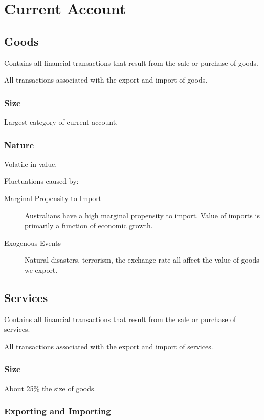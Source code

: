 \documentclass[a4paper,11pt]{article}
\begin{document}
\section{Current Account}

\subsection{Goods}

Contains all financial transactions that result from the sale or purchase of
goods.

All transactions associated with the export and import of goods.


\subsubsection{Size}

Largest category of current account.


\subsubsection{Nature}

Volatile in value.

Fluctuations caused by:

\begin{description}
\item [Marginal Propensity to Import] Australians have a high marginal
	propensity to import. Value of imports is primarily a function of economic
	growth.
\item [Exogenous Events] Natural disasters, terrorism, the exchange rate all
	affect the value of goods we export.
\end{description}


\subsection{Services}

Contains all financial transactions that result from the sale or purchase of
services.

All transactions associated with the export and import of services.


\subsubsection{Size}

About 25\% the size of goods.


\subsubsection{Exporting and Importing}
\end{document}

